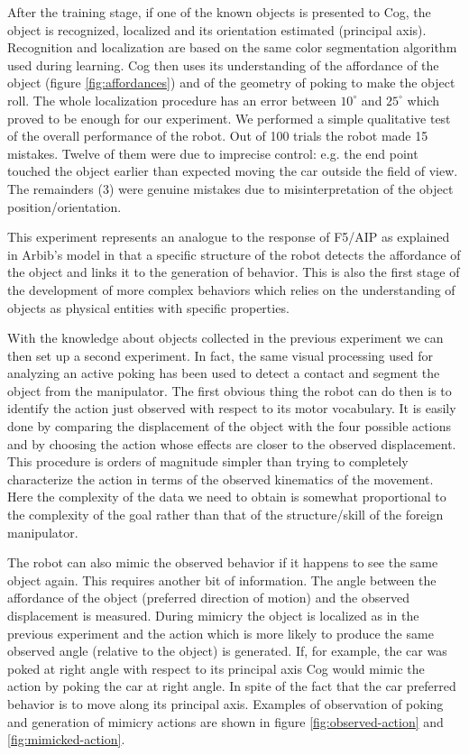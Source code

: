 After the training stage, if one of the known objects is presented to Cog, the 
object is recognized, localized and its orientation estimated (principal 
axis). Recognition and localization are based on the same color 
segmentation algorithm used during learning. Cog then uses its 
understanding of the affordance of the object (figure \ref{fig:affordances}) 
and of the geometry of poking to make the object roll. The whole localization 
procedure has an error between $10^{\circ}$ and $25^{\circ}$ which proved 
to be enough for our experiment. We performed a simple qualitative test of 
the overall performance of the robot. Out of 100 trials the robot made 15 
mistakes. Twelve of them were due to imprecise control: e.g. the end point 
touched the object earlier than expected moving the car outside the field of 
view. The remainders (3) were genuine mistakes due to misinterpretation of 
the object position/orientation.

This experiment represents an analogue to the response of F5/AIP as 
explained in Arbib's model \cite{fagg-arbib-1998} in that a specific 
structure of the robot detects the affordance of the object and links 
it to the generation of behavior. This is also the first stage of 
the development of more complex behaviors which relies on the understanding 
of objects as physical entities with specific properties.

With the knowledge about objects collected in the previous experiment
we can then set up a second experiment. In fact, the same visual processing 
used for analyzing an active poking has been used to detect a contact and 
segment the object from the manipulator. 
The first obvious thing the robot can do then is to identify the action 
just observed with respect to its motor vocabulary. It is easily done by 
comparing the displacement of the object with the four possible actions and 
by choosing the action whose effects are closer to the observed displacement. 
This procedure is orders of magnitude simpler than trying to completely 
characterize the action in terms of the observed kinematics of the movement. 
Here the complexity of the data we need to obtain is somewhat proportional 
to the complexity of the goal rather than that of the structure/skill of 
the foreign manipulator.

The robot can also mimic the observed behavior if it happens to see the 
same object again. This requires another bit of information. The angle 
between the affordance of the object (preferred direction of motion) and the 
observed displacement is measured. During mimicry the object is localized as 
in the previous experiment and the action which is more likely to 
produce the same observed angle (relative to the object) is generated. 
If, for example, the car was poked at right angle with respect to its principal 
axis Cog would mimic the action by poking the car at right angle. In spite 
of the fact that the car preferred behavior is to move along its principal 
axis. Examples of observation of poking and generation of mimicry actions are 
shown in figure \ref{fig:observed-action} and \ref{fig:mimicked-action}.

